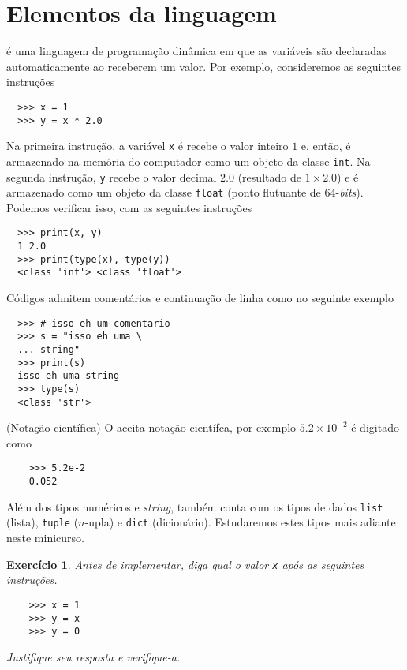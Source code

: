 \documentclass[12pt]{article}
\newtheorem{exr}{Exercício}[section]
\begin{document}
\section{Elementos da linguagem}\label{sec_elem}

{\python} é uma linguagem de programação dinâmica em que as variáveis são declaradas automaticamente ao receberem um valor. Por exemplo, consideremos as seguintes instruções
\begin{lstlisting}
  >>> x = 1
  >>> y = x * 2.0
\end{lstlisting}
Na primeira instrução, a variável \lstinline+x+ é recebe o valor inteiro $1$ e, então, é armazenado na memória do computador como um objeto da classe \lstinline+int+. Na segunda instrução, \lstinline+y+ recebe o valor decimal $2.0$ (resultado de $1\times 2.0$) e é armazenado como um objeto da classe \lstinline+float+ (ponto flutuante de 64-{\it bits}). Podemos verificar isso, com as seguintes instruções
\begin{lstlisting}
  >>> print(x, y)
  1 2.0
  >>> print(type(x), type(y))
  <class 'int'> <class 'float'>
\end{lstlisting}

Códigos {\python} admitem comentários e continuação de linha como no seguinte exemplo
\begin{lstlisting}
  >>> # isso eh um comentario
  >>> s = "isso eh uma \
  ... string"
  >>> print(s)
  isso eh uma string
  >>> type(s)
  <class 'str'>
\end{lstlisting}

\begin{obs}(Notação científica)
  O {\python} aceita notação científca, por exemplo $5.2\times 10^{-2}$ é digitado como
  \begin{lstlisting}
    >>> 5.2e-2
    0.052
  \end{lstlisting}
\end{obs}

\begin{obs}
  Além dos tipos numéricos e {\it string}, {\python} também conta com os tipos de dados \lstinline+list+ (lista), \lstinline+tuple+ ($n$-upla) e \lstinline+dict+ (dicionário). Estudaremos estes tipos mais adiante neste minicurso.
\end{obs}

\begin{exr}
  Antes de implementar, diga qual o valor \lstinline+x+ após as seguintes instruções.
  \begin{lstlisting}
    >>> x = 1
    >>> y = x
    >>> y = 0
  \end{lstlisting}
  Justifique seu resposta e verifique-a.
\end{exr}
\end{document}
